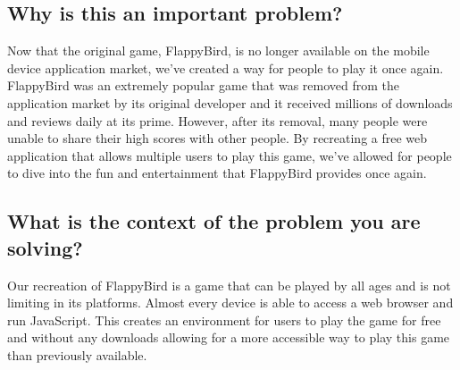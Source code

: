 \documentclass{article}
\begin{document}
\subsection{Why is this an important problem?}
Now that the original game, FlappyBird, is no longer available on the mobile device application market, we've created a way for people to play it once again. FlappyBird was an extremely popular game that was removed from the application market by its original developer and it received millions of downloads and reviews daily at its prime. However, after its removal, many people were unable to share their high scores with other people. By recreating a free web application that allows multiple users to play this game, we've allowed for people to dive into the fun and entertainment that FlappyBird provides once again.

\subsection{What is the context of the problem you are solving?}
Our recreation of FlappyBird is a game that can be played by all ages and is not limiting in its platforms. Almost every device is able to access a web browser and run JavaScript. This creates an environment for users to play the game for free and without any downloads allowing for a more accessible way to play this game than previously available.
\end{document}

